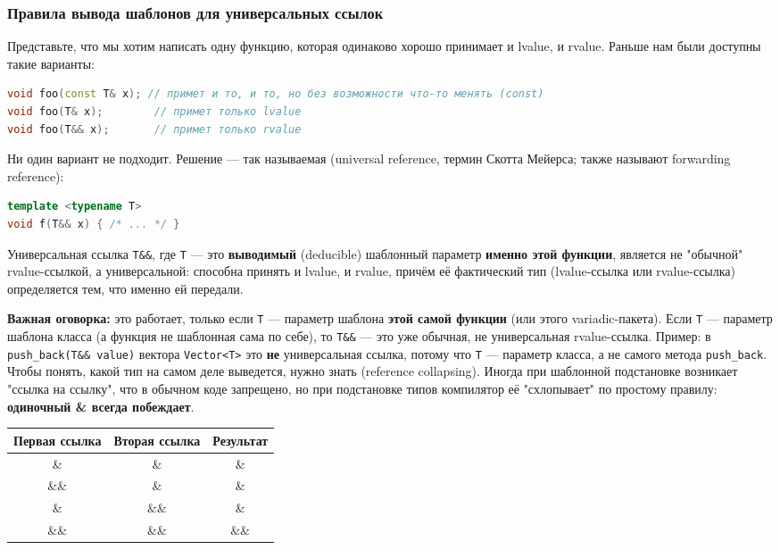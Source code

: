 \subsubsection{Правила вывода шаблонов для универсальных ссылок}
Представьте, что мы хотим написать одну функцию, которая одинаково хорошо принимает и lvalue, и rvalue. Раньше нам были доступны такие варианты:
\begin{lstlisting}[language=C++]
void foo(const T& x); // примет и то, и то, но без возможности что-то менять (const)
void foo(T& x);        // примет только lvalue
void foo(T&& x);       // примет только rvalue
\end{lstlisting}
Ни один вариант не подходит. Решение --- так называемая  (universal reference, термин Скотта Мейерса; также называют forwarding reference):
\begin{lstlisting}[language=C++]
template <typename T>
void f(T&& x) { /* ... */ }
\end{lstlisting}
\begin{definition}{Универсальная ссылка}{}
\texttt{T\&\&}, где \texttt{T} --- это \textbf{выводимый} (deducible) шаблонный параметр \textbf{именно этой функции}, является не "обычной" rvalue-ссылкой, а универсальной: способна принять и lvalue, и rvalue, причём её фактический тип (lvalue-ссылка или rvalue-ссылка) определяется тем, что именно ей передали.
\end{definition}
\textbf{Важная оговорка:} это работает, только если \texttt{T} --- параметр шаблона \textbf{этой самой функции} (или этого variadic-пакета). Если \texttt{T} --- параметр шаблона класса (а функция не шаблонная сама по себе), то \texttt{T\&\&} --- это уже обычная, не универсальная rvalue-ссылка. Пример: в \texttt{push\_back(T\&\& value)} вектора \texttt{Vector<T>} это \textbf{не} универсальная ссылка, потому что \texttt{T} --- параметр класса, а не самого метода \texttt{push\_back}.
Чтобы понять, какой тип на самом деле выведется, нужно знать  (reference collapsing). Иногда при шаблонной подстановке возникает "ссылка на ссылку", что в обычном коде запрещено, но при подстановке типов компилятор её "схлопывает" по простому правилу: \textbf{одиночный \& всегда побеждает}.
\begin{center}
\begin{tabular}{|c|c|c|}
\hline
\textbf{Первая ссылка} & \textbf{Вторая ссылка} & \textbf{Результат} \\
\hline
\& & \& & \& \\
\&\& & \& & \& \\
\& & \&\& & \& \\
\&\& & \&\& & \&\& \\
\hline
\end{tabular}
\end{center}
